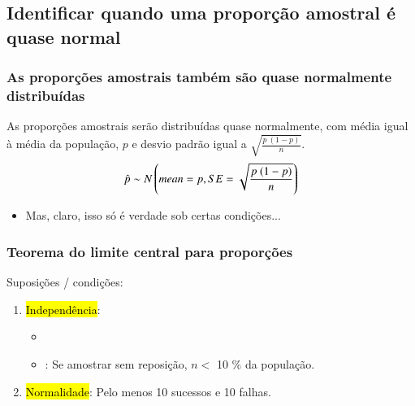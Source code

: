 
\subsection{Identificar quando uma proporção amostral é quase normal}


\begin{frame}
\frametitle{As proporções amostrais também são quase normalmente distribuídas}
\justifying
{}
{\justifying
As proporções amostrais serão distribuídas quase normalmente, com média igual à média da população, $p$ e desvio padrão igual a $\sqrt{\frac{p~(1-p)}{n}}$.
\[ \hat{p} \sim N \left(  mean = p, SE = \sqrt{\frac{p~(1-p)}{n}}  \right) \]
}

\begin{itemize}
\justifying
\item Mas, claro, isso só é verdade sob certas condições...

\end{itemize}

\vspace{-0.4 cm}

\justifying
{}
\vspace{-0.2 cm}
\pause
\vfill
\justifying
{}

\end{frame}

\begin{frame}
\frametitle{Teorema do limite central para proporções}

Suposições / condições:
\begin{enumerate}[1.]
\justifying
\item \hl{Independência}: 
\begin{itemize}
\justifying
\item {}
\justifying
\item {}: Se amostrar sem reposição, $ n <$ 10 \% da população.
\end{itemize}
\justifying
\item \hl{Normalidade}: Pelo menos 10 sucessos e 10 falhas.
\end{enumerate}

\end{frame}

